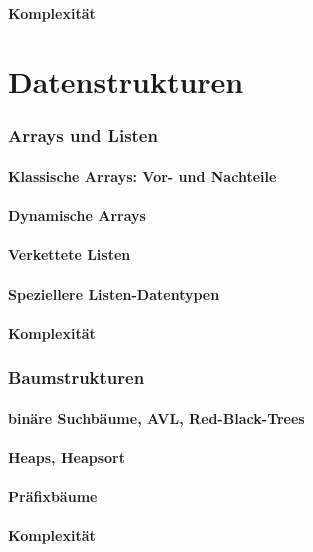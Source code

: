 \documentclass{beamer}
\begin{document}
\subsection{Komplexität}

\part{Datenstrukturen}

\section{Arrays und Listen}
\subsection{Klassische Arrays: Vor- und Nachteile}
\subsection{Dynamische Arrays}
\subsection{Verkettete Listen}
\subsection{Speziellere Listen-Datentypen}
\subsection{Komplexität}

\section{Baumstrukturen}
\subsection{binäre Suchbäume, AVL, Red-Black-Trees}
\subsection{Heaps, Heapsort}
\subsection{Präfixbäume}
\subsection{Komplexität}
\end{document}
